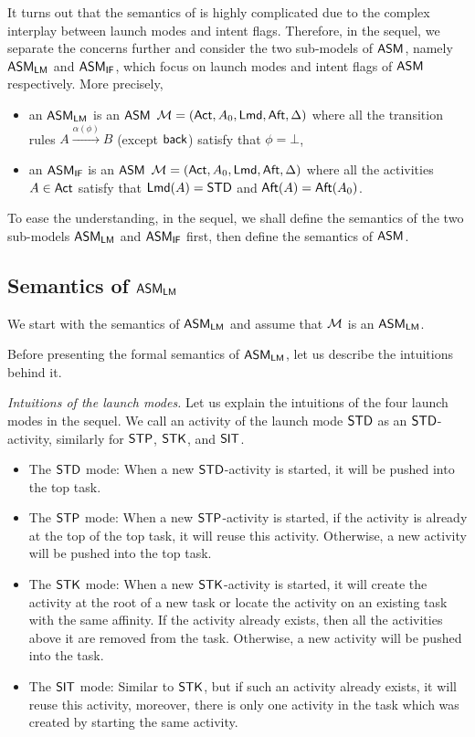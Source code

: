 It turns out that the semantics of {\AMASS} is highly complicated due to the complex interplay between launch modes and intent flags. Therefore, in the sequel, we separate the concerns further and consider the two sub-models of $\textsf{ASM}$, namely $\textsf{ASM}_\textsf{LM}$ and $\textsf{ASM}_\textsf{IF}$, which focus on launch modes and intent flags of $\textsf{ASM}$ respectively. 
More precisely, 
\begin{itemize}
	\item an $\textsf{ASM}_\textsf{LM}$ is an $\textsf{ASM}$ ${\mathcal{M} } = ({\sf Act}, A_0, {\sf Lmd}, {\sf Aft}, \Delta)$ where all the transition rules $A \xrightarrow{\alpha(\phi)} B$ (except ${\mathsf{back} }$) satisfy that $\phi = \bot$, 
	\item an $\textsf{ASM}_\textsf{IF}$ is an $\textsf{ASM}$ ${\mathcal{M} } = ({\sf Act}, A_0, {\sf Lmd}, {\sf Aft}, \Delta)$ where all the activities $A\in{\sf Act}$ satisfy that ${\sf Lmd}(A) = \mathsf{STD}$ and ${\sf Aft}(A) = {\sf Aft}(A_0)$.
\end{itemize}
To ease the understanding, in the sequel, we shall define the semantics of the two sub-models $\textsf{ASM}_\textsf{LM}$ and $\textsf{ASM}_\textsf{IF}$ first, then define the semantics of $\textsf{ASM}$. 



\subsection{Semantics of $\textsf{ASM}_\textsf{LM}$}

We start with the semantics of $\textsf{ASM}_\textsf{LM}$ and assume that ${\mathcal{M} }$ is an $\textsf{ASM}_\textsf{LM}$. 

Before presenting the formal semantics of $\textsf{ASM}_\textsf{LM}$, let us describe the intuitions behind it.

%
\emph{Intuitions of the launch modes.}  Let us explain the intuitions of the four launch modes in the sequel. 
We call an activity of the launch mode $\mathsf{STD}$ as an $\mathsf{STD}$-activity, similarly for $\mathsf{STP}$, $\mathsf{STK}$, and $\mathsf{SIT}$. 
\begin{itemize}
\item The $\mathsf{STD}$ mode: When a new $\mathsf{STD}$-activity is started, it will be pushed into the top task. 
%
\item The $\mathsf{STP}$ mode: When a new $\mathsf{STP}$-activity is started, if the activity is already at the top of the top task, it will reuse this activity. Otherwise, a new activity will be pushed into the top task.
%
\item The $\mathsf{STK}$ mode: When a new $\mathsf{STK}$-activity is started, it will create the activity at the root of a new task or locate the activity on an existing task with the same affinity. If the activity already exists, then all the activities above it are removed from the task. Otherwise, a new activity will be pushed into the task.
%
\item The $\mathsf{SIT}$ mode: 
Similar to $\mathsf{STK}$, but if such an activity already exists, it will reuse this activity, moreover, there is only one activity in the task which was created by starting the same activity.
\end{itemize}

